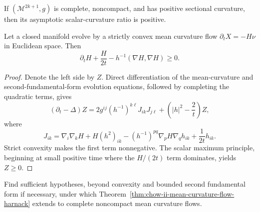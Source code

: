 \begin{theorem}
\label{thm:chow-ii-odd-dimensional-positive-curvature-gap}
If \((\mathcal M^{2k+1},g)\) is complete, noncompact, and has positive
sectional curvature, then its asymptotic scalar-curvature ratio is positive.
\end{theorem}

\begin{theorem}
\label{thm:chow-ii-mean-curvature-flow-harnack}
Let a closed manifold evolve by a strictly convex mean curvature flow
\(\partial_tX=-H\nu\) in Euclidean space.  Then
\[
\partial_tH+\frac{H}{2t}-h^{-1}(\nabla H,\nabla H)\ge0.
\]
\end{theorem}
\begin{proof}
Denote the left side by \(Z\).  Direct differentiation of the mean-curvature
and second-fundamental-form evolution equations, followed by completing the
quadratic terms, gives
\[
(\partial_t-\Delta)Z
=2g^{ij}(h^{-1})^{k\ell}J_{ik}J_{j\ell}
+\left(|h|^2-\frac2t\right)Z,
\]
where
\[
J_{ik}=\nabla_i\nabla_kH+H(h^2)_{ik}
-(h^{-1})^{pq}\nabla_pH\nabla_qh_{ik}+\frac1{2t}h_{ik}.
\]
Strict convexity makes the first term nonnegative.  The scalar maximum
principle, beginning at small positive time where the \(H/(2t)\) term
dominates, yields \(Z\ge0\).
\end{proof}

\begin{example}
\label{ex:chow-ii-complete-noncompact-mcf-harnack-problem}
Find sufficient hypotheses, beyond convexity and bounded second fundamental
form if necessary, under which
Theorem~\ref{thm:chow-ii-mean-curvature-flow-harnack} extends to complete
noncompact mean curvature flows.
\end{example}
